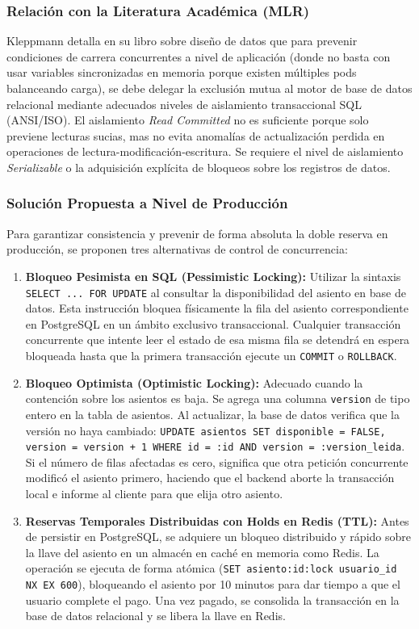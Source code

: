 \documentclass[12pt,letterpaper]{article}
\begin{document}
\subsubsection{Relación con la Literatura Académica (MLR)}
Kleppmann \cite{kleppmann} detalla en su libro sobre diseño de datos que para prevenir condiciones de carrera concurrentes a nivel de aplicación (donde no basta con usar variables sincronizadas en memoria porque existen múltiples pods balanceando carga), se debe delegar la exclusión mutua al motor de base de datos relacional mediante adecuados niveles de aislamiento transaccional SQL (ANSI/ISO). El aislamiento \textit{Read Committed} no es suficiente porque solo previene lecturas sucias, mas no evita anomalías de actualización perdida en operaciones de lectura-modificación-escritura. Se requiere el nivel de aislamiento \textit{Serializable} o la adquisición explícita de bloqueos sobre los registros de datos.

\subsubsection{Solución Propuesta a Nivel de Producción}
Para garantizar consistencia y prevenir de forma absoluta la doble reserva en producción, se proponen tres alternativas de control de concurrencia:
\begin{enumerate}
    \item \textbf{Bloqueo Pesimista en SQL (Pessimistic Locking):} Utilizar la sintaxis \texttt{SELECT ... FOR UPDATE} al consultar la disponibilidad del asiento en base de datos. Esta instrucción bloquea físicamente la fila del asiento correspondiente en PostgreSQL en un ámbito exclusivo transaccional. Cualquier transacción concurrente que intente leer el estado de esa misma fila se detendrá en espera bloqueada hasta que la primera transacción ejecute un \texttt{COMMIT} o \texttt{ROLLBACK}.
    \item \textbf{Bloqueo Optimista (Optimistic Locking):} Adecuado cuando la contención sobre los asientos es baja. Se agrega una columna \texttt{version} de tipo entero en la tabla de asientos. Al actualizar, la base de datos verifica que la versión no haya cambiado:
    \texttt{UPDATE asientos SET disponible = FALSE, version = version + 1 WHERE id = :id AND version = :version\_leida}.
    Si el número de filas afectadas es cero, significa que otra petición concurrente modificó el asiento primero, haciendo que el backend aborte la transacción local e informe al cliente para que elija otro asiento.
    \item \textbf{Reservas Temporales Distribuidas con Holds en Redis (TTL):} Antes de persistir en PostgreSQL, se adquiere un bloqueo distribuido y rápido sobre la llave del asiento en un almacén en caché en memoria como Redis. La operación se ejecuta de forma atómica (\texttt{SET asiento:id:lock usuario\_id NX EX 600}), bloqueando el asiento por 10 minutos para dar tiempo a que el usuario complete el pago. Una vez pagado, se consolida la transacción en la base de datos relacional y se libera la llave en Redis.
\end{enumerate}
\end{document}
